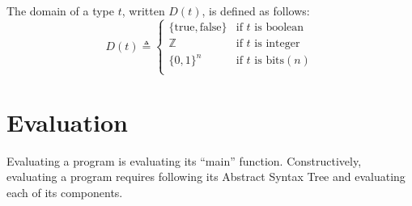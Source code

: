 \documentclass{book}
\begin{document}
The domain of a type $t$, written $D(t)$, is defined as follows:
  \[
  D(t) \triangleq \left\{
    \begin{array}{ll}
      \{\text{true}, \text{false} \} & \text{if } t \text{ is boolean}  \\
      \mathbb{Z}                     & \text{if } t \text{ is integer}  \\
      {\{0, 1\}}^n                   & \text{if } t \text{ is bits} (n) \\
    \end{array}
  \right.
  \]

\chapter{Evaluation}

Evaluating a program is evaluating its ``main'' function.
Constructively, evaluating a program requires following its
Abstract Syntax Tree and evaluating each of its components.
\end{document}
